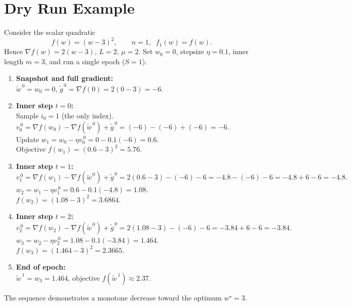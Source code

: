 \documentclass{article}
\begin{document}
\section*{Dry Run Example}
Consider the scalar quadratic
\[
    f(w)= (w-3)^2,\qquad n=1,\;\;f_1(w)=f(w).
\]
Hence $\nabla f(w)=2(w-3)$, $L=2$, $\mu=2$.
Set $w_0=0$, stepsize $\eta=0.1$, inner length $m=3$, and run a single epoch ($S=1$).

\begin{enumerate}[label=\arabic*.]
\item \textbf{Snapshot and full gradient:}\\
    $\tilde{w}^{\,0}=w_0=0$, 
    $\tilde{g}^{\,0}= \nabla f(0)=2(0-3)=-6$.
\item \textbf{Inner step $t=0$:}\\
    Sample $i_0=1$ (the only index).\\
    $v_0^{\,0}= \nabla f(w_0)-\nabla f(\tilde{w}^{\,0})+\tilde{g}^{\,0}
               =(-6)-(-6)+(-6)=-6.$\\
    Update $w_1 = w_0-\eta v_0^{\,0}=0-0.1(-6)=0.6.$\\
    Objective $f(w_1)=(0.6-3)^2=5.76$.
\item \textbf{Inner step $t=1$:}\\
    $v_1^{\,0}= \nabla f(w_1)-\nabla f(\tilde{w}^{\,0})+\tilde{g}^{\,0}
               =2(0.6-3)-(-6)-6 = -4.8-(-6)-6 = -4.8+6-6 = -4.8.$\\
    $w_2 = w_1-\eta v_1^{\,0}=0.6-0.1(-4.8)=1.08.$\\
    $f(w_2)=(1.08-3)^2=3.6864$.
\item \textbf{Inner step $t=2$:}\\
    $v_2^{\,0}= \nabla f(w_2)-\nabla f(\tilde{w}^{\,0})+\tilde{g}^{\,0}
               =2(1.08-3)-(-6)-6 = -3.84+6-6 = -3.84.$\\
    $w_3 = w_2-\eta v_2^{\,0}=1.08-0.1(-3.84)=1.464.$\\
    $f(w_3)=(1.464-3)^2=2.3665$.
\item \textbf{End of epoch:}\\
    $\tilde{w}^{\,1}=w_3=1.464$, objective $f(\tilde{w}^{\,1})\approx2.37$.
\end{enumerate}
The sequence demonstrates a monotone decrease toward the optimum $w^\star=3$.
\end{document}
